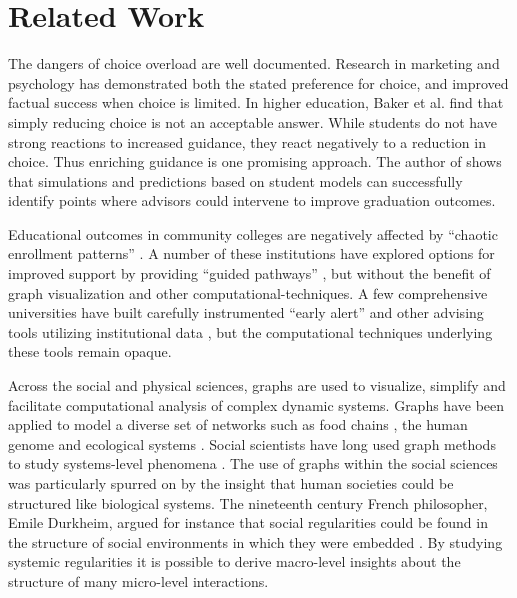 \section{Related Work}


The dangers of choice overload are well documented. Research in marketing \cite{botti2006} and psychology \cite{schwartz2004paradox,iyengar2000} has demonstrated both the stated preference for choice, and improved factual success when choice is limited. In higher education, Baker et al. \cite{bake2018} find that simply reducing choice is not an acceptable answer. While students do not have strong reactions to increased guidance, they react negatively to a reduction in choice. Thus enriching guidance is one promising approach. The author of \cite{slim2016} shows that simulations and predictions based on student models can successfully identify points where advisors could intervene to improve graduation outcomes.

Educational outcomes in community colleges are negatively affected by ``chaotic enrollment patterns'' \cite{crosta2014, bail2015, scot2015}. A number of these institutions have explored options for improved support by providing ``guided pathways'' \cite{jenkins2013}, but without the benefit of graph visualization and other computational-techniques. A few comprehensive universities have built carefully instrumented ``early alert'' and other advising tools utilizing institutional data \cite{fletcher2016integrated}, but the computational techniques underlying these tools remain opaque. 

Across the social and physical sciences, graphs are used to visualize, simplify and facilitate computational analysis of complex dynamic systems. Graphs have been applied to model a diverse set of networks such as food chains \cite{Hall1993}, the human genome \cite{Pevzner1989} and ecological systems \cite{Fortin2012}. Social scientists have long used graph methods to study systems-level phenomena \cite{Borgatti2009}. The use of graphs within the social sciences was particularly spurred on by the insight that human societies could be structured like biological systems. The nineteenth century French philosopher, Emile Durkheim, argued for instance that social regularities could be found in the structure of social environments in which they were embedded \cite{Durkheim1951}. By studying systemic regularities it is possible to derive macro-level insights about the structure of many micro-level interactions. 

